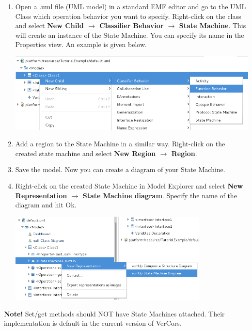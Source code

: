 \documentclass[12pt]{article}
\begin{document}
\begin{enumerate}
\item
Open a .uml file (UML model) in a standard EMF editor and go to the UML Class which operation behavior you want to specify. Right-click on the class and select \textbf{New Child $\rightarrow$ Classifier Behavior $\rightarrow$ State Machine}. This will create an instance of the State Machine. You can specify its name in the Properties view. An example is given below.

     \centerline{
     \includegraphics[width=14cm]{draws/sm-creation.png}
     \label{fig:vce-proj}
     }

\item 
Add a region to the State Machine in a similar way. Right-click on the created state machine and select \textbf{New Region $\rightarrow$ Region}.
\item
Save the model. Now you can create a diagram of your State Machine.
\item
Right-click on the created State Machine in Model Explorer and select \textbf{New Representation $\rightarrow$ State Machine diagram}. Specify the name of the diagram and hit Ok.

     \centerline{
     \includegraphics[width=10cm]{draws/sm-diagr.png}
     \label{fig:vce-proj}
     }
\end{enumerate}

\textbf{Note! }Set/get methods should NOT have State Machines attached. Their implementation is default in the current version of VerCors.
\end{document}
